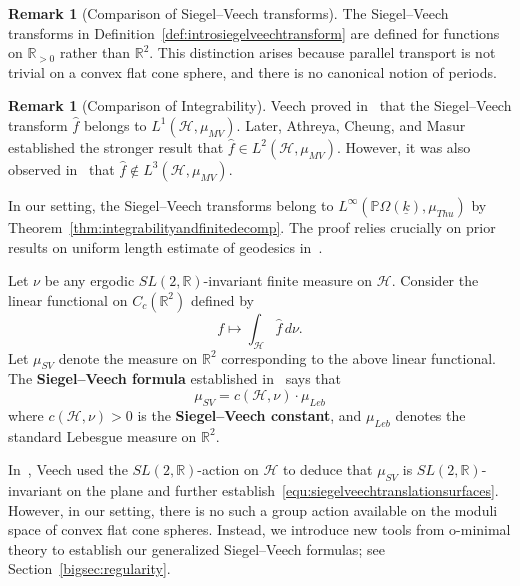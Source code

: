 \documentclass{compositio}
\numberwithin{equation}{section}
\numberwithin{figure}{section}
\theoremstyle{definition}
\newtheorem{remark}[definition]{Remark}
\theoremstyle{plain}
\begin{document}
{\begin{remark}[Comparison of Siegel--Veech transforms]\label{rmk:comparetransforms}
    The Siegel--Veech transforms in Definition~\ref{def:introsiegelveechtransform} are defined for functions on $\mathbb{R}_{>0}$ rather than $\mathbb{R}^2$. This distinction arises because parallel transport is not trivial on a convex flat cone sphere, and there is no canonical notion of periods.
\end{remark}

\begin{remark}[Comparison of Integrability]
    Veech proved in~\cite{Veech} that the Siegel--Veech transform $\hat{f}$ belongs to $L^1(\mathcal{H},\mu_{MV})$. Later, Athreya, Cheung, and Masur~\cite{athreya2019siegel} established the stronger result that $\hat{f} \in L^2(\mathcal{H},\mu_{MV})$. However, it was also observed in~\cite{athreya2019siegel} that $\hat{f} \notin L^3(\mathcal{H},\mu_{MV})$.

    In our setting, the Siegel--Veech transforms belong to $L^\infty(\mathbb{P}\Omega(\underline{k}),\mu_{Thu})$ by Theorem~\ref{thm:integrabilityandfinitedecomp}. The proof relies crucially on prior results on uniform length estimate of geodesics in~\cite{fu2023boundssaddleconnectionsflat, fu2024uniformlengthestimatestrajectories}.
\end{remark}

Let $\nu$ be any ergodic $SL(2,\mathbb{R})$-invariant finite measure on $\mathcal{H}$. Consider the linear functional on $C_c(\mathbb{R}^2)$ defined by
$$
f\mapsto \int_{\mathcal{H}}\hat{f} \, d\nu.
$$
Let $\mu_{SV}$ denote the measure on $\mathbb{R}^2$ corresponding to the above linear functional.
The \textbf{Siegel--Veech formula} established in~\cite{Veech} says that
\begin{equation}\label{equ:siegelveechtranslationsurfaces}
    \mu_{SV} = c(\mathcal{H},\nu)\cdot\mu_{Leb}
\end{equation}
where $c(\mathcal{H},\nu)>0$ is the \textbf{Siegel--Veech constant}, and $\mu_{Leb}$ denotes the standard Lebesgue measure on $\mathbb{R}^2$.

In~\cite{Veech}, Veech used the $SL(2,\mathbb{R})$-action on $\mathcal{H}$ to deduce that $\mu_{SV}$ is $SL(2,\mathbb{R})$-invariant on the plane and further establish~\eqref{equ:siegelveechtranslationsurfaces}. However, in our setting, there is no such a group action available on the moduli space of convex flat cone spheres. Instead, we introduce new tools from o-minimal theory to establish our generalized Siegel--Veech formulas; see Section~\ref{bigsec:regularity}.

}
\end{document}
